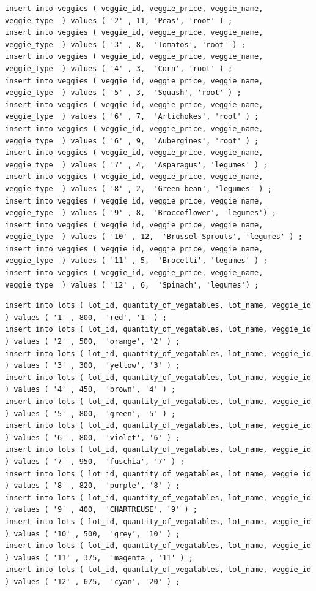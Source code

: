 \begin{verbatim}
insert into veggies ( veggie_id, veggie_price, veggie_name, veggie_type  ) values ( '2' , 11, 'Peas', 'root' ) ;
insert into veggies ( veggie_id, veggie_price, veggie_name, veggie_type  ) values ( '3' , 8,  'Tomatos', 'root' ) ;
insert into veggies ( veggie_id, veggie_price, veggie_name, veggie_type  ) values ( '4' , 3,  'Corn', 'root' ) ;
insert into veggies ( veggie_id, veggie_price, veggie_name, veggie_type  ) values ( '5' , 3,  'Squash', 'root' ) ;
insert into veggies ( veggie_id, veggie_price, veggie_name, veggie_type  ) values ( '6' , 7,  'Artichokes', 'root' ) ;
insert into veggies ( veggie_id, veggie_price, veggie_name, veggie_type  ) values ( '6' , 9,  'Aubergines', 'root' ) ;
insert into veggies ( veggie_id, veggie_price, veggie_name, veggie_type  ) values ( '7' , 4,  'Asparagus', 'legumes' ) ;
insert into veggies ( veggie_id, veggie_price, veggie_name, veggie_type  ) values ( '8' , 2,  'Green bean', 'legumes' ) ;
insert into veggies ( veggie_id, veggie_price, veggie_name, veggie_type  ) values ( '9' , 8,  'Broccoflower', 'legumes') ;
insert into veggies ( veggie_id, veggie_price, veggie_name, veggie_type  ) values ( '10' , 12,  'Brussel Sprouts', 'legumes' ) ;
insert into veggies ( veggie_id, veggie_price, veggie_name, veggie_type  ) values ( '11' , 5,  'Brocelli', 'legumes' ) ;
insert into veggies ( veggie_id, veggie_price, veggie_name, veggie_type  ) values ( '12' , 6,  'Spinach', 'legumes') ;
\end{verbatim}

\begin{verbatim}
insert into lots ( lot_id, quantity_of_vegatables, lot_name, veggie_id ) values ( '1' , 800,  'red', '1' ) ; 
insert into lots ( lot_id, quantity_of_vegatables, lot_name, veggie_id ) values ( '2' , 500,  'orange', '2' ) ; 
insert into lots ( lot_id, quantity_of_vegatables, lot_name, veggie_id ) values ( '3' , 300,  'yellow', '3' ) ; 
insert into lots ( lot_id, quantity_of_vegatables, lot_name, veggie_id ) values ( '4' , 450,  'brown', '4' ) ; 
insert into lots ( lot_id, quantity_of_vegatables, lot_name, veggie_id ) values ( '5' , 800,  'green', '5' ) ; 
insert into lots ( lot_id, quantity_of_vegatables, lot_name, veggie_id ) values ( '6' , 800,  'violet', '6' ) ; 
insert into lots ( lot_id, quantity_of_vegatables, lot_name, veggie_id ) values ( '7' , 950,  'fuschia', '7' ) ; 
insert into lots ( lot_id, quantity_of_vegatables, lot_name, veggie_id ) values ( '8' , 820,  'purple', '8' ) ; 
insert into lots ( lot_id, quantity_of_vegatables, lot_name, veggie_id ) values ( '9' , 400,  'CHARTREUSE', '9' ) ; 
insert into lots ( lot_id, quantity_of_vegatables, lot_name, veggie_id ) values ( '10' , 500,  'grey', '10' ) ; 
insert into lots ( lot_id, quantity_of_vegatables, lot_name, veggie_id ) values ( '11' , 375,  'magenta', '11' ) ; 
insert into lots ( lot_id, quantity_of_vegatables, lot_name, veggie_id ) values ( '12' , 675,  'cyan', '20' ) ; 
\end{verbatim}


